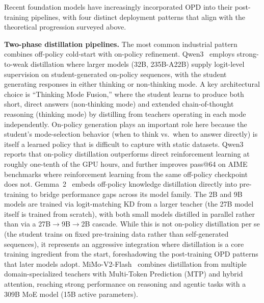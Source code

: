 \documentclass{article} %
\begin{document}
Recent foundation models have increasingly incorporated OPD into their post-training pipelines, with four distinct deployment patterns that align with the theoretical progression surveyed above.

\textbf{Two-phase distillation pipelines.} The most common industrial pattern combines off-policy cold-start with on-policy refinement. Qwen3~\citep{2505.09388} employs strong-to-weak distillation where larger models (32B, 235B-A22B) supply logit-level supervision on student-generated on-policy sequences, with the student generating responses in either thinking or non-thinking mode. A key architectural choice is ``Thinking Mode Fusion,'' where the student learns to produce both short, direct answers (non-thinking mode) and extended chain-of-thought reasoning (thinking mode) by distilling from teachers operating in each mode independently. On-policy generation plays an important role here because the student's mode-selection behavior (when to think vs.\ when to answer directly) is itself a learned policy that is difficult to capture with static datasets. Qwen3 reports that on-policy distillation outperforms direct reinforcement learning at roughly one-tenth of the GPU hours, and further improves pass@64 on AIME benchmarks where reinforcement learning from the same off-policy checkpoint does not. Gemma~2~\citep{2408.00118} embeds off-policy knowledge distillation directly into pre-training to bridge performance gaps across its model family. The 2B and 9B models are trained via logit-matching KD from a larger teacher (the 27B model itself is trained from scratch), with both small models distilled in parallel rather than via a 27B$\to$9B$\to$2B cascade. While this is not on-policy distillation per se (the student trains on fixed pre-training data rather than self-generated sequences), it represents an aggressive integration where distillation is a core training ingredient from the start, foreshadowing the post-training OPD patterns that later models adopt. MiMo-V2-Flash~\citep{2601.02780} combines distillation from multiple domain-specialized teachers with Multi-Token Prediction (MTP) and hybrid attention, reaching strong performance on reasoning and agentic tasks with a 309B MoE model (15B active parameters).
\end{document}
